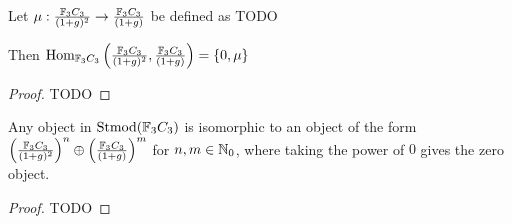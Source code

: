 \begin{theorem} \label{thm:f_3c_3_mu}
    Let \( \mu: \frac{{\mathbb{F}}_3C_3}{(1 + g)^2} \to \frac{{\mathbb{F}}_3C_3}{(1 + g)} \) be defined as TODO

    Then \( \operatorname{Hom}_{{\mathbb{F}}_3C_3}\left(\frac{{\mathbb{F}}_3C_3}{(1 + g)^2}, \frac{{\mathbb{F}}_3C_3}{(1 + g)}\right) = \left\{0, \mu\right\} \)
\end{theorem}
\begin{proof}
    TODO
\end{proof}

\begin{theorem}
    Any object in \( \operatorname{Stmod}({\mathbb{F}}_3C_3) \) is isomorphic to an object of the form \( \left( \frac{{\mathbb{F}}_3C_3}{(1 + g)^2} \right)^n \oplus \left( \frac{{\mathbb{F}}_3C_3}{(1 + g)} \right)^m \) for \( n, m \in {\mathbb{N}}_0 \), where taking the power of \( 0 \) gives the zero object.
\end{theorem}
\begin{proof}
    TODO
\end{proof}

